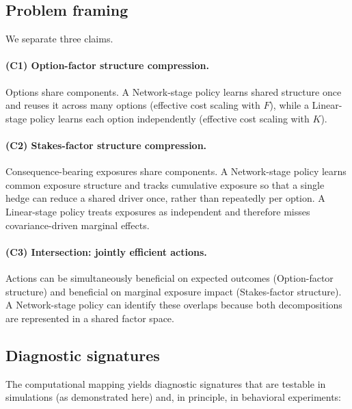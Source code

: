 \documentclass[11pt]{article}
\begin{document}
\subsection{Problem framing}

We separate three claims.

\paragraph{(C1) Option-factor structure compression.}
Options share components. A Network-stage policy learns shared structure once and reuses it across many options (effective cost scaling with $F$), while a Linear-stage policy learns each option independently (effective cost scaling with $K$).

\paragraph{(C2) Stakes-factor structure compression.}
Consequence-bearing exposures share components. A Network-stage policy learns common exposure structure and tracks cumulative exposure so that a single hedge can reduce a shared driver once, rather than repeatedly per option. A Linear-stage policy treats exposures as independent and therefore misses covariance-driven marginal effects.

\paragraph{(C3) Intersection: jointly efficient actions.}
Actions can be simultaneously beneficial on expected outcomes (Option-factor structure) and beneficial on marginal exposure impact (Stakes-factor structure). A Network-stage policy can identify these overlaps because both decompositions are represented in a shared factor space.


\subsection{Diagnostic signatures}

The computational mapping yields diagnostic signatures that are testable in simulations (as demonstrated here) and, in principle, in behavioral experiments:
\end{document}
